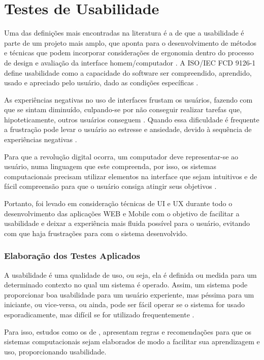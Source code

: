 \chapter{Testes de Usabilidade}

Uma das definições mais encontradas na literatura é a de que a usabilidade é parte de um projeto mais amplo, que aponta para o desenvolvimento de métodos e técnicas que podem incorporar considerações de ergonomia dentro do processo de design e avaliação da interface homem/computador \cite{bastien1993ergonomic}. A ISO/IEC FCD 9126-1 define usabilidade como a capacidade do software ser compreendido, aprendido, usado e apreciado pelo usuário, dado as condições específicas \cite{gonccalves2009usabilidade}.

As experiências negativas no uso de interfaces frustam os usuários, fazendo com que se sintam diminuído, culpando-se por não conseguir realizar tarefas que, hipoteticamente, outros usuários conseguem \cite{gonccalves2009usabilidade}. Quando essa dificuldade é frequente a frustração pode levar o usuário ao estresse e ansiedade, devido à sequência de experiências negativas \cite{cybis2003engenharia}.

Para que a revolução digital ocorra, um computador deve representar-se ao usuário, numa linguagem que este compreenda, por isso, os sistemas computacionais precisam utilizar elementos na interface que sejam intuitivos e de fácil compreensão para que o usuário consiga atingir seus objetivos \cite{johnson2001cultura}.

Portanto, foi levado em consideração técnicas de UI e UX durante todo o desenvolvimento das aplicações WEB e Mobile com o objetivo de facilitar a usabilidade e deixar a experiência mais fluida possível para o usuário, evitando com que haja frustrações para com o sistema desenvolvido.

\subsection{Elaboração dos Testes Aplicados}

A usabilidade é uma qualidade de uso, ou seja, ela é definida ou medida para um determinado contexto no qual um sistema é operado. Assim, um sistema pode proporcionar boa usabilidade para um usuário experiente, mas péssima para um iniciante, ou vice-versa, ou ainda, pode ser fácil operar se o sistema for usado esporadicamente, mas difícil se for utilizado frequentemente \cite{cybis2003engenharia}.

Para isso, estudos como os de \cite{bastien1993ergonomic}, apresentam regras e recomendações para que os sistemas computacionais sejam elaborados de modo a facilitar sua aprendizagem e uso, proporcionando usabilidade.

